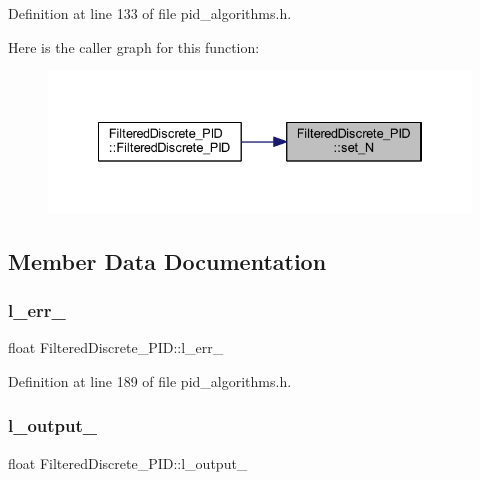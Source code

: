 Definition at line 133 of file pid\+\_\+algorithms.\+h.

Here is the caller graph for this function\+:
\nopagebreak
\begin{figure}[H]
\begin{center}
\leavevmode
\includegraphics[width=334pt]{class_filtered_discrete___p_i_d_a65d51421738b55322736c62cc91dcbb5_icgraph}
\end{center}
\end{figure}


\subsection{Member Data Documentation}
\mbox{\label{class_filtered_discrete___p_i_d_ae081b8ac8ee32207d5fb130d5b51d8f3}} 
\subsubsection{\texorpdfstring{l\_err\_}{l\_err\_}}
{\footnotesize\ttfamily float Filtered\+Discrete\+\_\+\+P\+I\+D\+::l\+\_\+err\+\_\+\hspace{0.3cm}{\ttfamily [private]}}



Definition at line 189 of file pid\+\_\+algorithms.\+h.

\mbox{\label{class_filtered_discrete___p_i_d_ac6562f9f1686366da268e34adfb02e48}} 
\subsubsection{\texorpdfstring{l\_output\_}{l\_output\_}}
{\footnotesize\ttfamily float Filtered\+Discrete\+\_\+\+P\+I\+D\+::l\+\_\+output\+\_\+\hspace{0.3cm}{\ttfamily [private]}}



